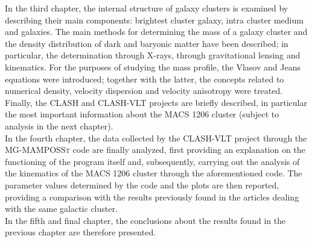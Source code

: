 In the third chapter, the internal structure of galaxy clusters is examined by describing their main components: brightest cluster galaxy, intra cluster medium and galaxies. The main methods for determining the mass of a galaxy cluster and the density distribution of dark and baryonic matter have been described; in particular, the determination through X-rays, through gravitational lensing and kinematics. For the purposes of studying the mass profile, the Vlasov and Jeans equations were introduced; together with the latter, the concepts related to numerical density, velocity dispersion and velocity anisotropy were treated. Finally, the CLASH and CLASH-VLT projects are briefly described, in particular the most important information about the MACS 1206 cluster (subject to analysis in the next chapter).\\
In the fourth chapter, the data collected by the CLASH-VLT project through the \textsc{MG-MAMPOSSt} code are finally analyzed, first providing an explanation on the functioning of the program itself and, subsequently, carrying out the analysis of the kinematics of the MACS 1206 cluster through the aforementioned code. The parameter values determined by the code and the plots are then reported, providing a comparison with the results previously found in the articles dealing with the same galactic cluster.\\
In the fifth and final chapter, the conclusions about the results found in the previous chapter are therefore presented.